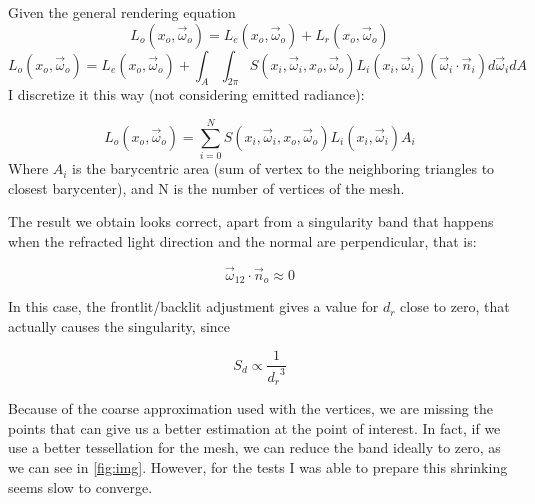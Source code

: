 \documentclass[12pt, twoside,a4paper]{article}
\begin{document}
Given the general rendering equation
$$
L_o(x_o, \vec{\omega}_o) = L_e(x_o, \vec{\omega}_o) + L_r(x_o, \vec{\omega}_o)  
$$
$$
L_o(x_o, \vec{\omega}_o) = L_e(x_o, \vec{\omega}_o) + \int_A \int_{2 \pi} S(x_i, \vec{\omega}_i, x_o, \vec{\omega}_o) L_i(x_i, \vec{\omega}_i) (\vec{\omega}_i \cdot \vec{n}_i) d \vec{\omega}_i dA 
$$
I discretize it this way (not considering emitted radiance):


$$
L_o(x_o, \vec{\omega}_o) = \sum_{i = 0}^{N} S(x_i, \vec{\omega}_i, x_o, \vec{\omega}_o) L_i(x_i, \vec{\omega}_i) A_i 
$$
Where $A_i$ is the barycentric area (sum of vertex to the neighboring triangles to closest barycenter), and N is the number of vertices of the mesh.

The result we obtain looks correct, apart from a singularity band that happens when the refracted light direction and the normal are perpendicular, that is:

$$
 \vec{\omega}_{12}  \cdot  \vec{n}_o \approx 0
$$

In this case, the frontlit/backlit adjustment gives a value for $d_r$ close to zero, that actually causes the singularity, since 

$$
S_d \propto \frac{1}{{d_r}^3}
$$

Because of the coarse approximation used with the vertices, we are missing the points that can give us a better estimation at the point of interest. In fact, if we use a better tessellation for the mesh, we can reduce the band ideally to zero, as we can see in \ref{fig:img}. However, for the tests I was able to prepare this shrinking seems slow to converge.
\end{document}

